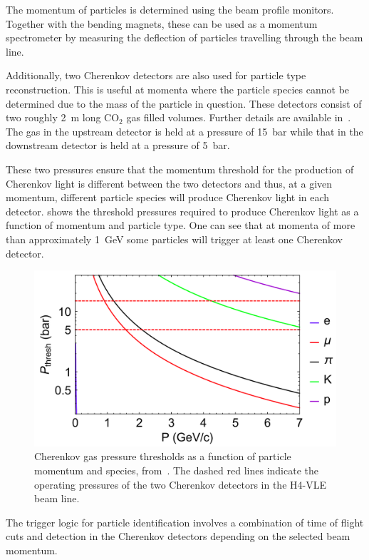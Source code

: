 The momentum of particles is determined using the beam profile monitors.
Together with the bending magnets, these can be used as a momentum spectrometer by measuring the deflection of particles travelling through the beam line.

Additionally, two Cherenkov detectors are also used for particle type reconstruction.
This is useful at momenta where the particle species cannot be determined due to the mass of the particle in question.
These detectors consist of two roughly \SI{2}{\m} long $\text{CO}_{2}$ gas filled volumes. Further details are available in~\cite{vleCherenkov}.
The gas in the upstream detector is held at a pressure of \SI{15}{\bar} while that in the downstream detector is held at a pressure of \SI{5}{\bar}.

These two pressures ensure that the momentum threshold for the production of Cherenkov light is different between the two detectors and thus, at a given momentum, different particle species will produce Cherenkov light in each detector.
 shows the threshold pressures required to produce Cherenkov light as a function of momentum and particle type.
One can see that at momenta of more than approximately \SI{1}{\GeV} some particles will trigger at least one Cherenkov detector.

\begin{figure}[h]
	\centering
	\includegraphics[width=.6\linewidth]{files/figures/protodune_detector/cherenkovThresh}
	\caption[Cherenkov gas pressure thresholds as a function of particle momentum and species]{Cherenkov gas pressure thresholds as a function of particle momentum and species, from~\cite{boothBeamLineInstr}. The dashed red lines indicate the operating pressures of the two Cherenkov detectors in the H4-VLE beam line.}
	\label{fig:cherenkovThresh}
\end{figure}

The trigger logic for particle identification involves a combination of time of flight cuts and detection in the Cherenkov detectors depending on the selected beam momentum.

